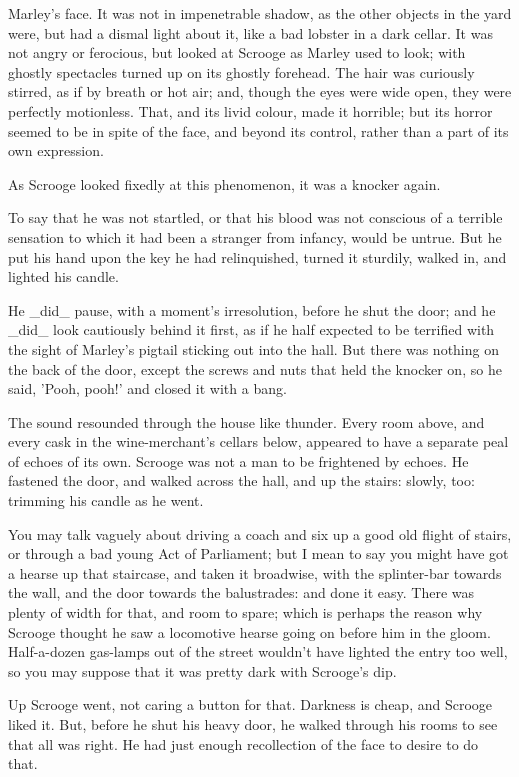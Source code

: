 Marley's face. It was not in impenetrable shadow, as the other objects
in the yard were, but had a dismal light about it, like a bad lobster in
a dark cellar. It was not angry or ferocious, but looked at Scrooge as
Marley used to look; with ghostly spectacles turned up on its ghostly
forehead. The hair was curiously stirred, as if by breath or hot air;
and, though the eyes were wide open, they were perfectly motionless.
That, and its livid colour, made it horrible; but its horror seemed to
be in spite of the face, and beyond its control, rather than a part of
its own expression.

As Scrooge looked fixedly at this phenomenon, it was a knocker again.

To say that he was not startled, or that his blood was not conscious of
a terrible sensation to which it had been a stranger from infancy, would
be untrue. But he put his hand upon the key he had relinquished, turned
it sturdily, walked in, and lighted his candle.

He _did_ pause, with a moment's irresolution, before he shut the door;
and he _did_ look cautiously behind it first, as if he half expected to
be terrified with the sight of Marley's pigtail sticking out into the
hall. But there was nothing on the back of the door, except the screws
and nuts that held the knocker on, so he said, 'Pooh, pooh!' and closed
it with a bang.

The sound resounded through the house like thunder. Every room above,
and every cask in the wine-merchant's cellars below, appeared to have a
separate peal of echoes of its own. Scrooge was not a man to be
frightened by echoes. He fastened the door, and walked across the hall,
and up the stairs: slowly, too: trimming his candle as he went.

You may talk vaguely about driving a coach and six up a good old flight
of stairs, or through a bad young Act of Parliament; but I mean to say
you might have got a hearse up that staircase, and taken it broadwise,
with the splinter-bar towards the wall, and the door towards the
balustrades: and done it easy. There was plenty of width for that, and
room to spare; which is perhaps the reason why Scrooge thought he saw a
locomotive hearse going on before him in the gloom. Half-a-dozen
gas-lamps out of the street wouldn't have lighted the entry too well, so
you may suppose that it was pretty dark with Scrooge's dip.

Up Scrooge went, not caring a button for that. Darkness is cheap, and
Scrooge liked it. But, before he shut his heavy door, he walked through
his rooms to see that all was right. He had just enough recollection of
the face to desire to do that.

